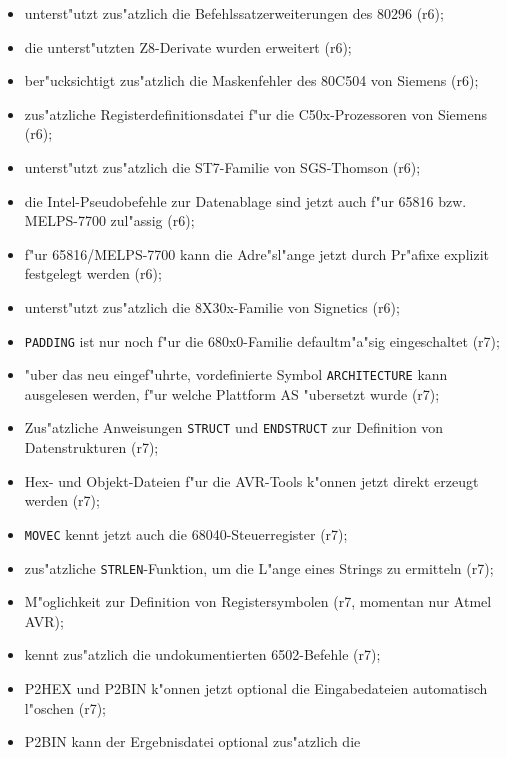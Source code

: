 \documentclass[12pt,a4paper,twoside]{report}
\newcommand{\tty}[1]{{\tt #1}}
\newcommand{\asname}{AS}
\begin{document}
\begin{itemize}
{\begin{itemize}
{            Instruments (r6);}
      \item{unterst"utzt zus"atzlich die Befehlssatzerweiterungen
            des 80296 (r6);}
      \item{die unterst"utzten Z8-Derivate wurden erweitert
            (r6);}
      \item{ber"ucksichtigt zus"atzlich die Maskenfehler des 80C504
            von Siemens (r6);}
      \item{zus"atzliche Registerdefinitionsdatei f"ur die C50x-Prozessoren
            von Siemens (r6);}
      \item{unterst"utzt zus"atzlich die ST7-Familie von SGS-Thomson (r6);}
      \item{die Intel-Pseudobefehle zur Datenablage sind jetzt
            auch f"ur 65816 bzw. MELPS-7700 zul"assig (r6);}
      \item{f"ur 65816/MELPS-7700 kann die Adre"sl"ange jetzt durch
            Pr"afixe explizit festgelegt werden (r6);}
      \item{unterst"utzt zus"atzlich die 8X30x-Familie von Signetics
            (r6);}
      \item{\tty{PADDING} ist nur noch f"ur die 680x0-Familie defaultm"a"sig
            eingeschaltet (r7);}
      \item{"uber das neu eingef"uhrte, vordefinierte Symbol
            \tty{ARCHITECTURE} kann ausgelesen werden, f"ur welche
            Plattform \asname{} "ubersetzt wurde (r7);}
      \item{Zus"atzliche Anweisungen \tty{STRUCT} und \tty{ENDSTRUCT} zur
            Definition von Datenstrukturen (r7);}
      \item{Hex- und Objekt-Dateien f"ur die AVR-Tools k"onnen jetzt
            direkt erzeugt werden (r7);}
      \item{\tty{MOVEC} kennt jetzt auch die 68040-Steuerregister (r7);}
      \item{zus"atzliche \tty{STRLEN}-Funktion, um die L"ange eines
            Strings zu ermitteln (r7);}
      \item{M"oglichkeit zur Definition von Registersymbolen (r7, momentan
            nur Atmel AVR);}
      \item{kennt zus"atzlich die undokumentierten 6502-Befehle (r7);}
      \item{P2HEX und P2BIN k"onnen jetzt optional die Eingabedateien
            automatisch l"oschen (r7);}
      \item{P2BIN kann der Ergebnisdatei optional zus"atzlich die
}
\end{itemize}}
\end{itemize}
\end{document}
